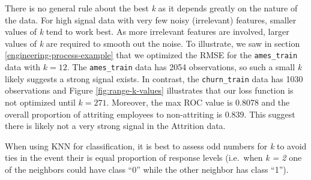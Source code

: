 \documentclass[]{krantz}
\makeatletter
\newenvironment{kframe}{%
\medskip{}
\setlength{\fboxsep}{.8em}
 \def\at@end@of@kframe{}%
 \ifinner\ifhmode%
  \def\at@end@of@kframe{\end{minipage}}%
  \begin{minipage}{\columnwidth}%
 \fi\fi%
 \def\FrameCommand##1{\hskip\@totalleftmargin \hskip-\fboxsep
 \colorbox{shadecolor}{##1}\hskip-\fboxsep
     \hskip-\linewidth \hskip-\@totalleftmargin \hskip\columnwidth}%
 \MakeFramed {\advance\hsize-\width
   \@totalleftmargin\z@ \linewidth\hsize
   \@setminipage}}%
 {\par\unskip\endMakeFramed%
 \at@end@of@kframe}
\newenvironment{block}[1]
  {
  \begin{itemize}
  \renewcommand{\labelitemi}{
    \raisebox{-.7\height}[0pt][0pt]{
      {\setkeys{Gin}{width=3em,keepaspectratio}\texttt{[image: icons/\#1]}}
    }
  }
  \setlength{\fboxsep}{1em}
  \begin{kframe}
  \item
  }
  {
  \end{kframe}
  \end{itemize}
  }
\newenvironment{tip}
  {\begin{block}{tip}}
  {\end{block}}
\makeatother
\begin{document}
There is no general rule about the best \emph{k} as it depends greatly on the nature of the data. For high signal data with very few noisy (irrelevant) features, smaller values of \emph{k} tend to work best. As more irrelevant features are involved, larger values of \emph{k} are required to smooth out the noise. To illustrate, we saw in section \ref{engineering-process-example} that we optimized the RMSE for the \texttt{ames\_train} data with \(k = 12\). The \texttt{ames\_train} data has 2054 observations, so such a small \emph{k} likely suggests a strong signal exists. In contrast, the \texttt{churn\_train} data has 1030 observations and Figure \ref{fig:range-k-values} illustrates that our loss function is not optimized until \(k = 271\). Moreover, the max ROC value is 0.8078 and the overall proportion of attriting employees to non-attriting is 0.839. This suggest there is likely not a very strong signal in the Attrition data.

\begin{tip}
When using KNN for classification, it is best to assess odd numbers for
\emph{k} to avoid ties in the event their is equal proportion of
response levels (i.e.~when \emph{k = 2} one of the neighbors could have
class ``0'' while the other neighbor has class ``1'').
\end{tip}
\end{document}
